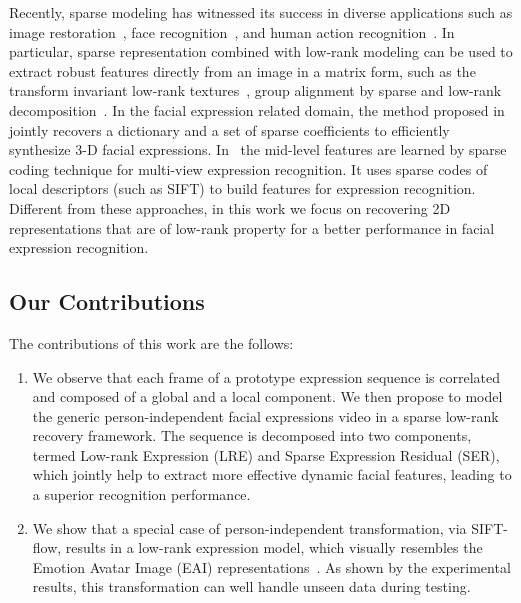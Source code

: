 \documentclass[journal]{IEEEtran}
\begin{document}
Recently, sparse modeling has witnessed its success in diverse applications such as image restoration~\cite{Yang_CVPR08}, face recognition~\cite{Wright_PAMI09}, and human action recognition~\cite{Qiu_ICCV11}. In particular, sparse representation combined with low-rank modeling can be used to extract robust features directly from an image in a matrix form, such as the transform invariant low-rank textures~\cite{Zhang_IJCV12}, group alignment by sparse and low-rank decomposition~\cite{Peng_PAMI12}. In the facial expression related domain, the method proposed in~\cite{Lin12} jointly recovers a dictionary and a set of sparse coefficients to efficiently synthesize 3-D facial expressions. In~\cite{Tariq12} the mid-level features are learned by sparse coding technique for multi-view expression recognition. It uses sparse codes of local descriptors (such as SIFT) to build features for expression recognition. Different from these approaches, in this work we focus on recovering 2D representations that are of low-rank property for a better performance in facial expression recognition. 

\subsection{Our Contributions}
The contributions of this work are the follows:
\begin{enumerate}
\item We observe that each frame of a prototype expression sequence is correlated and composed of a global and a local component. We then propose to model the generic person-independent facial expressions video in a sparse low-rank recovery framework. The sequence is decomposed into two components, termed Low-rank Expression (LRE) and Sparse Expression Residual (SER), which jointly help to extract more effective dynamic facial features, leading to a superior recognition performance. 
\item We show that a special case of person-independent transformation, via SIFT-flow, results in a low-rank expression model, which visually resembles the Emotion Avatar Image (EAI) representations~\cite{Yang_SMCB12}. As shown by the experimental results, this transformation can well handle unseen data during testing.
\end{enumerate}
\end{document}
